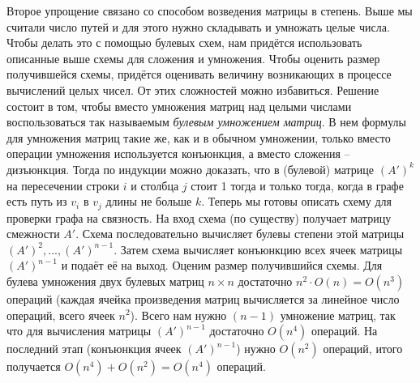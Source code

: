\documentclass{article}
\begin{document}
\newline
Второе упрощение связано со способом возведения матрицы в степень. Выше мы считали число путей и для этого нужно складывать и умножать целые числа. Чтобы делать это с помощью булевых схем, нам придётся использовать описанные выше схемы для сложения и умножения. Чтобы оценить размер получившейся схемы, придётся оценивать величину возникающих в процессе вычислений целых чисел. От этих сложностей можно избавиться.
\newline
Решение состоит в том, чтобы вместо умножения матриц над целыми числами воспользоваться так называемым \textit{булевым умножением матриц}. В нем формулы для умножения матриц такие же, как и в обычном умножении, только вместо операции умножения используется конъюнкция, а вместо сложения – дизъюнкция. Тогда по индукции можно доказать, что в (булевой) матрице $(A')^k$ на пересечении строки $i$ и столбца $j$ стоит 1 тогда и только тогда, когда в графе есть путь из $v_i$ в $v_j$ длины не больше $k$.
\newline
Теперь мы готовы описать схему для проверки графа на связность. На вход схема (по существу) получает матрицу смежности $A'$. Схема последовательно вычисляет булевы степени этой матрицы $(A')^2, . . . , (A')^{n-1}$. Затем схема вычисляет конъюнкцию всех ячеек матрицы $(A')^{n-1}$ и подаёт её на выход.
\newline
Оценим размер получившийся схемы. Для булева умножения двух булевых матриц $n \times n$ достаточно $n^2 \cdot O(n) = O(n^3)$ операций (каждая ячейка произведения матриц вычисляется за линейное число операций, всего ячеек $n^2$). Всего нам нужно $(n-1)$ умножение матриц, так что для вычисления матрицы $(A')^{n-1}$ достаточно $O(n^4)$ операций. На последний этап (конъюнкция ячеек $(A')^{n-1}$) нужно $O(n^2)$ операций, итого получается $O(n^4) + O(n^2) = O(n^4)$ операций.
\end{document}
